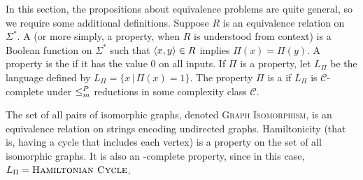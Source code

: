 
In this section, the propositions about equivalence problems are quite general, so we require some additional definitions.
Suppose $R$ is an equivalence relation on $\Sigma^*$.
A  (or more simply, a property, when $R$ is understood from context) is a Boolean function on $\Sigma^*$ such that $\left\langle x,y\right\rangle \in R$ implies $\Pi(x) = \Pi(y)$.
A property is the  if it has the value $0$ on all inputs.
If $\Pi$ is a property, let $L_\Pi$ be the language defined by $L_\Pi = \{ x \, | \, \Pi(x) = 1 \}$.
The property $\Pi$ is a  if $L_\Pi$ is $\mathcal{C}$-complete under $\leq^{P}_{m}$ reductions in some complexity class $\mathcal{C}$.
\begin{example}
  The set of all pairs of isomorphic graphs, denoted \textsc{Graph Isomorphism}, is an equivalence relation on strings encoding undirected graphs.
  Hamiltonicity (that is, having a cycle that includes each vertex) is a property on the set of all isomorphic graphs. %
  It is also an \NP-complete property, since in this case, $L_\Pi = \textsc{Hamiltonian Cycle}$.
\end{example}

